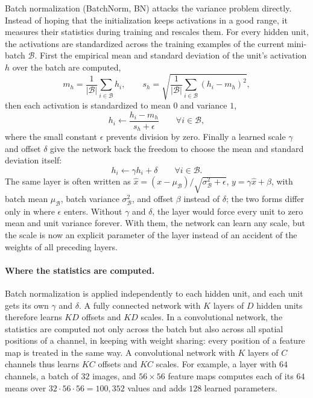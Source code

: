 Batch normalization (BatchNorm, BN) attacks the variance problem directly.
Instead of hoping that the initialization keeps activations in a good range, it
measures their statistics during training and rescales them. For every hidden
unit, the activations are standardized across the training examples of the
current mini-batch $\mathcal{B}$. First the empirical mean and standard
deviation of the unit's activation $h$ over the batch are computed,
\begin{equation}
  m_h = \frac{1}{|\mathcal{B}|} \sum_{i \in \mathcal{B}} h_i , \qquad
  s_h = \sqrt{\frac{1}{|\mathcal{B}|} \sum_{i \in \mathcal{B}} (h_i - m_h)^2} ,
\end{equation}
then each activation is standardized to mean $0$ and variance $1$,
\begin{equation}
  h_i \leftarrow \frac{h_i - m_h}{s_h + \epsilon}
  \qquad \forall i \in \mathcal{B} ,
\end{equation}
where the small constant $\epsilon$ prevents division by zero. Finally a learned
scale $\gamma$ and offset $\delta$ give the network back the freedom to choose
the mean and standard deviation itself:
\begin{equation}
  h_i \leftarrow \gamma h_i + \delta \qquad \forall i \in \mathcal{B} .
  \label{eq:bn-affine}
\end{equation}
\noindent
The same layer is often written as
$\hat{x} = (x - \mu_\mathcal{B})/\sqrt{\sigma_\mathcal{B}^2 + \epsilon}$,
$y = \gamma \hat{x} + \beta$, with batch mean $\mu_\mathcal{B}$, batch variance
$\sigma_\mathcal{B}^2$, and offset $\beta$ instead of $\delta$; the two forms
differ only in where $\epsilon$ enters. Without $\gamma$ and $\delta$, the layer
would force every unit to zero mean and unit variance forever. With them, the
network can learn any scale, but the scale is now an explicit parameter of the
layer instead of an accident of the weights of all preceding layers.

\paragraph{Where the statistics are computed.}
Batch normalization is applied independently to each hidden unit, and each unit
gets its own $\gamma$ and $\delta$. A fully connected network with $K$ layers of
$D$ hidden units therefore learns $KD$ offsets and $KD$ scales. In a
convolutional network, the statistics are computed not only across the batch but
also across all spatial positions of a channel, in keeping with weight sharing:
every position of a feature map is treated in the same way. A convolutional
network with $K$ layers of $C$ channels thus learns $KC$ offsets and $KC$
scales. For example, a layer with $64$ channels, a batch of $32$ images, and
$56\times56$ feature maps computes each of its $64$ means over
$32\cdot56\cdot56 = 100{,}352$ values and adds $128$ learned parameters.


